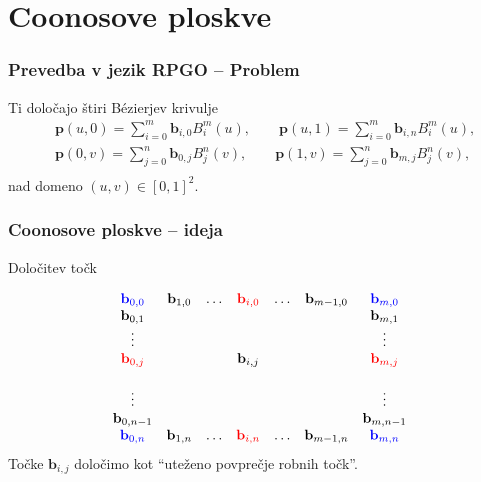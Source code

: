 \documentclass{beamer}
\begin{document}
\section{Coonosove ploskve}

\begin{frame}
    \frametitle{Prevedba v jezik RPGO -- Problem}
\begin{block}{Ti določajo štiri Bézierjev krivulje}
    \begin{align*}
        &\mathbf{p}(u,0) =\sum_{i=0}^m \mathbf{b}_{i,0} B_i^m(u), \qquad
        \mathbf{p}(u,1) =\sum_{i=0}^m \mathbf{b}_{i,n} B_i^m(u),  \\
        &\mathbf{p}(0,v) =\sum_{j=0}^n \mathbf{b}_{0,j} B_j^n(v), \qquad
        \mathbf{p}(1,v) =\sum_{j=0}^n \mathbf{b}_{m,j} B_j^n(v),  \\
    \end{align*}    
    nad domeno $(u,v) \in [0,1]^2.$
\end{block}


\end{frame}



\begin{frame}
    \frametitle{Coonosove ploskve -- ideja}
    \begin{block}{Določitev točk}
    
    $$
    \begin{matrix}
        \color{blue} \mathbf{b}_{0,0}  &\mathbf{b}_{1,0} & \ldots & \color{red} \mathbf{b}_{i,0} & \ldots &\mathbf{b}_{m-1,0}  &\color{blue} \mathbf{b}_{m,0} \\
       \mathbf{b}_{0,1}  &                 &        & &      &                   &\mathbf{b}_{m,1} \\
       \vdots            &                 &        & &     &                   &  \vdots\\
       \color{red} \mathbf{b}_{0,j}                 &                 &        & \mathbf{b}_{i,j} &  &   & \color{red} \mathbf{b}_{m,j} \\                  &  \\
       \vdots            &                 &        & &    &                   & \vdots \\
       \mathbf{b}_{0,n-1} &                &         & &     &                    &\mathbf{b}_{m,n-1} \\ 
       \color{blue} \mathbf{b}_{0,n}  &\mathbf{b}_{1,n} & \ldots  & \color{red} \mathbf{b}_{i,n} & \ldots  &\mathbf{b}_{m-1,n} &\color{blue} \mathbf{b}_{m,n} 
    \end{matrix}
    $$
    Točke $\mathbf{b}_{i,j}$ določimo kot ``uteženo povprečje robnih točk''.
\end{block}
    
\end{frame}
\end{document}
